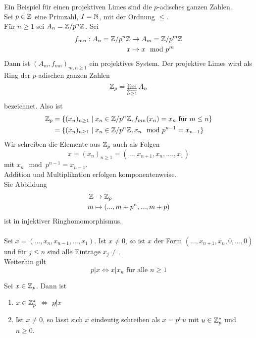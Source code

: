 	\begin{exm}
		Ein Beispiel für einen projektiven Limes sind die $p$-adisches ganzen Zahlen.\\
		Sei $p\in\mathbb{Z}$ eine Primzahl, $I=\mathbb{N}$, mit der Ordnung $\leq$.\\
		Für $n\geq 1$ sei $A_n=\mathbb{Z}/p^n\mathbb{Z}$. Sei
		\begin{align*}
		f_{mn}:A_n=\mathbb{Z}/p^n\mathbb{Z}&\to A_m=\mathbb{Z}/p^m\mathbb{Z}\\
		x&\mapsto x\mod p^m
		\end{align*}
		Dann ist $(A_m,f_{mn})_{m,n\geq 1}$ ein projektives System. Der projektive Limes wird als Ring der $p$-adischen ganzen Zahlen 
		\[\mathbb{Z}_p=\lim\limits_{\overleftarrow{n\geq 1}}A_n\]
		bezeichnet. Also ist
		\begin{align*}
		\mathbb{Z}_p&=\{(x_n)_{n\geq 1}\mid x_n\in\mathbb{Z}/p^n\mathbb{Z},f_{mn}(x_n)=x_n\text{ für }m\leq n\}\\
		&=\{(x_n)_{n\geq 1}\mid x_n\in\mathbb{Z}/p^n\mathbb{Z},x_n\mod p^{n-1}=x_{n-1}\}
		\end{align*}
		Wir schreiben die Elemente aus $\mathbb{Z}_p$ auch als Folgen
		\[x=(x_n)_{n\geq 1}=(...,x_{n+1},x_n,....,x_1)\]
		mit $x_n\mod p^{n-1}=x_{n-1}$.\\
		Addition und Multiplikation erfolgen komponentenweise.\\
		Sie Abbildung
		\begin{align*}
		\mathbb{Z}&\to\mathbb{Z}_p\\
		m&\mapsto(...,m+p^n,...,m+p)
		\end{align*}
		ist in injektiver Ringhomomorphismus.\\
		\\
		
		Sei $x=(...,x_n,x_{n-1},...,x_1)$. Ist $x\neq 0$, so ist $x$ der Form $(...,x_{n+1},x_n,0,...,0)$ und für $j\leq n$ sind alle Einträge $x_j\neq$.\\
		Weiterhin gilt
		\[p|x\Leftrightarrow\text{$x|x_n$ für alle $n\geq 1$}\]
	\end{exm}

	\begin{satz}
		Sei $x\in\mathbb{Z}_p$. Dann ist
		\begin{enumerate}
			\item $x\in\mathbb{Z}_p^*$ $\Leftrightarrow$ $p\not| x$
			\item Ist $x\neq 0$, so lässt sich $x$ eindeutig schreiben als $x=p^nu$ mit $u\in\mathbb{Z}_p^*$ und $n\geq 0$.
		\end{enumerate}
	\end{satz}

